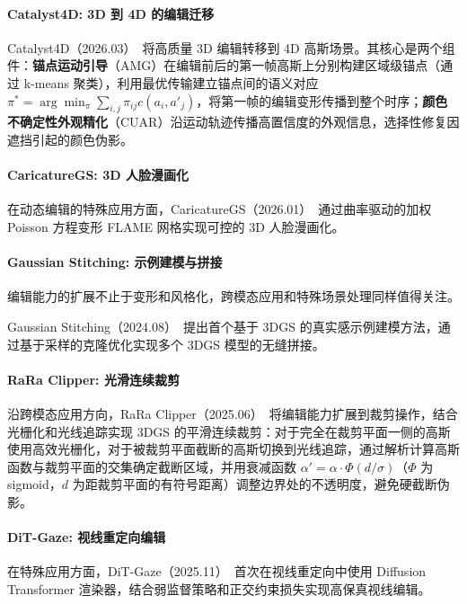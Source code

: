 \paragraph{Catalyst4D: 3D 到 4D 的编辑迁移}

Catalyst4D（2026.03）~\cite{2603_12766}将高质量 3D 编辑转移到 4D 高斯场景。其核心是两个组件：\textbf{锚点运动引导}（AMG）在编辑前后的第一帧高斯上分别构建区域级锚点（通过 k-means 聚类），利用最优传输建立锚点间的语义对应 $\pi^* = \arg\min_\pi \sum_{i,j} \pi_{ij} c(a_i, a'_j)$，将第一帧的编辑变形传播到整个时序；\textbf{颜色不确定性外观精化}（CUAR）沿运动轨迹传播高置信度的外观信息，选择性修复因遮挡引起的颜色伪影。

\paragraph{CaricatureGS: 3D 人脸漫画化}

在动态编辑的特殊应用方面，CaricatureGS（2026.01）~\cite{2601_03319}通过曲率驱动的加权 Poisson 方程变形 FLAME 网格实现可控的 3D 人脸漫画化。

\paragraph{Gaussian Stitching: 示例建模与拼接}

编辑能力的扩展不止于变形和风格化，跨模态应用和特殊场景处理同样值得关注。

Gaussian Stitching（2024.08）~\cite{2408_15708}提出首个基于 3DGS 的真实感示例建模方法，通过基于采样的克隆优化实现多个 3DGS 模型的无缝拼接。

\paragraph{RaRa Clipper: 光滑连续裁剪}

沿跨模态应用方向，RaRa Clipper（2025.06）~\cite{2506_20202}将编辑能力扩展到裁剪操作，结合光栅化和光线追踪实现 3DGS 的平滑连续裁剪：对于完全在裁剪平面一侧的高斯使用高效光栅化，对于被裁剪平面截断的高斯切换到光线追踪，通过解析计算高斯函数与裁剪平面的交集确定截断区域，并用衰减函数 $\alpha' = \alpha \cdot \Phi(d/\sigma)$（$\Phi$ 为 sigmoid，$d$ 为距裁剪平面的有符号距离）调整边界处的不透明度，避免硬截断伪影。

\paragraph{DiT-Gaze: 视线重定向编辑}

在特殊应用方面，DiT-Gaze（2025.11）~\cite{2511_11231}首次在视线重定向中使用 Diffusion Transformer 渲染器，结合弱监督策略和正交约束损失实现高保真视线编辑。

